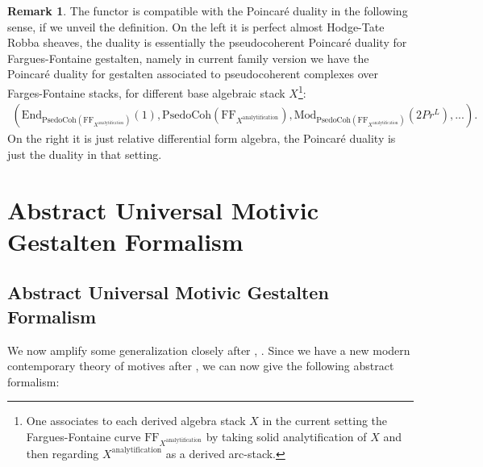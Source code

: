 \documentclass[12pt]{article}
\theoremstyle{definition}
\newtheorem{remark}{Remark}
\begin{document}
\begin{remark}
The functor is compatible with the Poincar\'e duality in the following sense, if we unveil the definition. On the left it is perfect almost Hodge-Tate Robba sheaves, the duality is essentially the pseudocoherent Poincar\'e duality for Fargues-Fontaine gestalten, namely in current family version we have the Poincar\'e duality for gestalten associated to pseudocoherent complexes over Farges-Fontaine stacks, for different base algebraic stack $X$\footnote{One associates to each derived algebra stack $X$ in the current setting the Fargues-Fontaine curve $\mathrm{FF}_{X^\mathrm{analytification}}$ by taking solid analytification of $X$ and then regarding $X^\mathrm{analytification}$ as a derived arc-stack.}:
\begin{align}
(\mathrm{End}_{\mathrm{PsedoCoh}(\mathrm{FF}_{X^\mathrm{analytification}})}(1),\mathrm{PsedoCoh}(\mathrm{FF}_{X^\mathrm{analytification}}), \mathrm{Mod}_{\mathrm{PsedoCoh}(\mathrm{FF}_{X^\mathrm{analytification}})}(2Pr^L),...).
\end{align}
On the right it is just relative differential form algebra, the Poincar\'e duality is just the duality in that setting. 
\end{remark}

\newpage
\section{Abstract Universal Motivic Gestalten Formalism}

\subsection{Abstract Universal Motivic Gestalten Formalism}

\noindent We now amplify some generalization closely after \cite{5S4}, \cite{5S5}. Since we have a new modern contemporary theory of motives after \cite{5S4}, we can now give the following abstract formalism:
\end{document}
